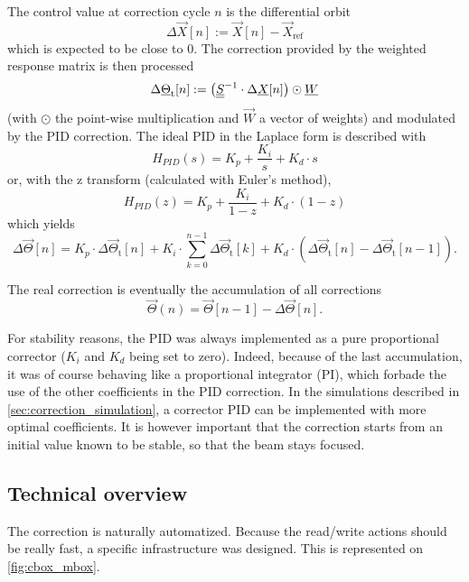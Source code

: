 The control value at correction cycle $n$ is the differential orbit
\begin{equation}
 \Delta \vec{X}[n] := \vec{X}[n]-\vec{X}_\text{ref}
\end{equation}
which is expected to be close to 0. The correction provided by the weighted response matrix is then processed
\begin{equation}
\Delta \underline{\Theta}_\text{t}[n] :=  \left(\underline{\underline{S}}^{-1} \cdot \Delta \underline{X}[n] \right) \odot \underline{W}
\end{equation}
(with $\odot$ the point-wise multiplication and $\vec{W}$ a vector of weights) and modulated by the PID correction. The ideal PID in the Laplace form is described with
\begin{equation}
H_{PID}(s) = K_p + \frac{K_i}{s} + K_d \cdot s
\end{equation}
or, with the z transform (calculated with Euler's method),
\begin{equation}
H_{PID}(z) = K_p + \frac{K_i}{1-z} + K_d \cdot (1-z)
\end{equation}
which yields
\begin{equation}
\Delta \vec{\Theta}[n] =  K_p \cdot \Delta \vec{\Theta}_\text{t}[n] + K_i \cdot \sum\limits_{k=0}^{n-1}\Delta \vec{\Theta}_\text{t}[k] + K_d \cdot \left(\Delta \vec{\Theta}_\text{t}[n] - \Delta \vec{\Theta}_\text{t}[n-1]\right).
\end{equation}

The real correction is eventually the accumulation of all corrections
\begin{equation}
\vec{\Theta}(n) = \vec{\Theta}[n-1] - \Delta \vec{\Theta}[n].
\end{equation}

For stability reasons, the PID was always implemented as a pure proportional corrector ($K_i$ and $K_d$ being set to zero). Indeed, because of the last accumulation, it was of course behaving like a proportional integrator (PI), which forbade the use of the other coefficients in the PID correction. In the simulations described in \cref{sec:correction_simulation}, a corrector PID can be implemented with more optimal coefficients. It is however important that the correction starts from an initial value known to be stable, so that the beam stays focused.

\subsection{Technical overview}
\label{sec:correction_sa_technical}
The correction is naturally automatized. Because the read/write actions should be really fast, a specific infrastructure was designed. This is represented on \cref{fig:cbox_mbox}.

